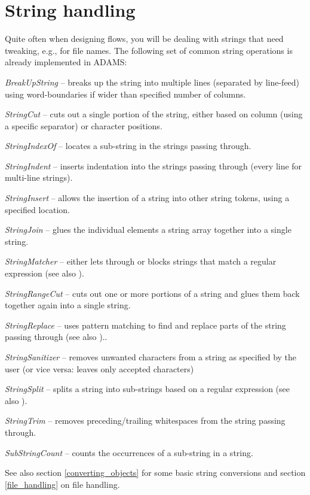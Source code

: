 \section{String handling}
\label{string_handling}
Quite often when designing flows, you will be dealing with strings that need
tweaking, e.g., for file names. The following set of common string operations is
already implemented in ADAMS:
\begin{tight_itemize}
	\item \textit{BreakUpString} -- breaks up the string into multiple lines 
	(separated by line-feed) using word-boundaries if wider than specified 
	number of columns.
	\item \textit{StringCut} -- cuts out a single portion of the string, either
	based on column (using a specific separator) or character positions.
	\item \textit{StringIndexOf} -- locates a sub-string in the strings passing
	through.
	\item \textit{StringIndent} -- inserts indentation into the strings
	passing through (every line for multi-line strings).
	\item \textit{StringInsert} -- allows the insertion of a string into other
	string tokens, using a specified location.
	\item \textit{StringJoin} -- glues the individual elements a string array
	together into a single string.
	\item \textit{StringMatcher} -- either lets through or blocks strings that
	match a regular expression (see also \cite{regexp}).
	\item \textit{StringRangeCut} -- cuts out one or more portions of a string and
	glues them back together again into a single string.
	\item \textit{StringReplace} -- uses pattern matching to find and replace parts
	of the string passing through (see also \cite{regexp})..
	\item \textit{StringSanitizer} -- removes unwanted characters from a string as
	specified by the user (or vice versa: leaves only accepted characters)
	\item \textit{StringSplit} -- splits a string into sub-strings based on a
	regular expression (see also \cite{regexp}).
	\item \textit{StringTrim} -- removes preceding/trailing whitespaces from the
	string passing through.
	\item \textit{SubStringCount} -- counts the occurrences of a sub-string
	in a string.
\end{tight_itemize}
See also section \ref{converting_objects} for some basic string conversions and
section \ref{file_handling} on file handling.

